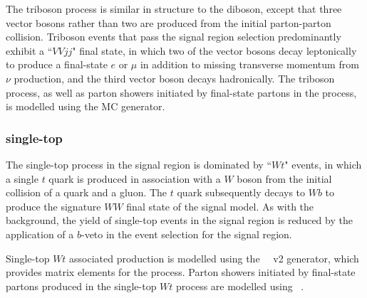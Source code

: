The triboson process is similar in structure to the diboson, except that three vector bosons rather than two are produced from the initial parton-parton collision. Triboson events that pass the signal region selection predominantly exhibit a ``\(VVjj\)" final state, in which two of the vector bosons decay leptonically to produce a final-state \(e\) or \(\mu\) in addition to missing transverse momentum from \(\nu\) production, and the third vector boson decays hadronically. The triboson process, as well as parton showers initiated by final-state partons in the process, is modelled using the \SHERPA[2.2] MC generator. 

\subsubsection{single-top}
\label{sec:stop_description}

The single-top process in the signal region is dominated by ``\(Wt\)" events, in which a single \(t\) quark is produced in association with a \(W\) boson from the initial collision of a quark and a gluon. The \(t\) quark subsequently decays to \(Wb\) to produce the signature \(WW\) final state of the signal model. As with the \ttbar background, the yield of single-top events in the signal region is reduced by the application of a \(b\)-veto in the event selection for the signal region.    

Single-top \(Wt\) associated production is modelled using the \POWHEGBOX~\cite{Re:2010bp,Nason:2004rx,Frixione:2007vw,Alioli:2010xd}~v2 generator, which provides matrix elements for the process. Parton showers initiated by final-state partons produced in the single-top \(Wt\) process are modelled using ~\cite{Sjostrand:2014zea}. 

